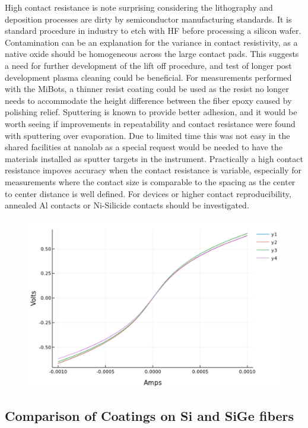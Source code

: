 High contact resistance is note surprising considering the lithography and deposition processes are dirty by semiconductor manufacturing standards. It is standard procedure in industry to etch with HF before processing a silicon wafer. Contamination can be an explanation for the variance in contact resistivity, as a native oxide should be homogeneous across the large contact pads. This suggests a need for further development of the lift off procedure, and test of longer post development plasma cleaning could be beneficial. For measurements performed with the MiBots, a thinner resist coating could be used as the resist no longer needs to accommodate the height difference between the fiber epoxy caused by polishing relief. Sputtering is known to provide better adhesion, and it would be worth seeing if improvements in repeatability and contact resistance were found with sputtering over evaporation. Due to limited time this was not easy in the shared facilities at nanolab as a special request would be needed to have the materials installed as sputter targets in the instrument. Practically a high contact resistance impoves accuracy when the contact resistance is variable, especially for measurements where the contact size is comparable to the spacing as the center to center distance is well defined. For devices or higher contact reproducibility, annealed Al contacts or Ni-Silicide contacts should be investigated. 

\begin{figure}
    \centering
    \includegraphics[width=\textwidth]{fig/Results/2pnt_compareMb25.jpg}
    \caption{}
    \label{fig:mb25 2pnt}
\end{figure}
\FloatBarrier
\subsection{Comparison of Coatings on Si and SiGe fibers}

